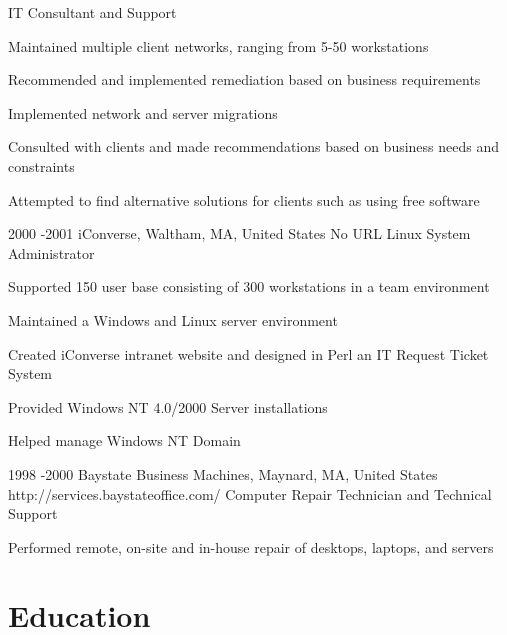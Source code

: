 \documentclass[10pt]{article} %
\begin{document}
{IT Consultant and Support}
{\begin{itemize-noindent}
\item{Maintained multiple client networks, ranging from 5-50 workstations}
\item{Recommended and implemented remediation based on business requirements}
\item{Implemented network and server migrations}
\item{Consulted with clients and made recommendations based on business needs and constraints}
\item{Attempted to find alternative solutions for clients such as using free software}
\end{itemize-noindent}}
\job
{2000 -}{2001}
{iConverse, Waltham, MA, United States}
{No URL}
{Linux System Administrator}
{\begin{itemize-noindent}
\item{Supported 150 user base consisting of 300 workstations in a team environment}
\item{Maintained a Windows and Linux server environment}
\item{Created iConverse intranet website and designed in Perl an IT Request Ticket System}
\item{Provided Windows NT 4.0/2000 Server installations}
\item{Helped manage Windows NT Domain}
\end{itemize-noindent}}

\job
{1998 -}{2000}
{Baystate Business Machines, Maynard, MA, United States}
{http://services.baystateoffice.com/}
{Computer Repair Technician and Technical Support}
{\begin{itemize-noindent}
\item{Performed remote, on-site and in-house repair of desktops, laptops, and servers}
\end{itemize-noindent}}
\section{Education}
\end{document}
